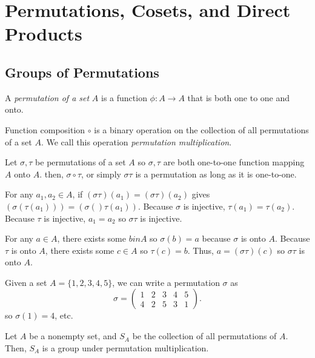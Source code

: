\chapter{Permutations, Cosets, and Direct Products}

\section{Groups of Permutations}

\begin{definition}
    A \emph{permutation of a set} $A$ is a function $\phi\colon A \to A$ that is both one to one and onto.
\end{definition}
\begin{remark}
    Function composition $\circ$ is a binary operation on the collection of all permutations of a set $A$. We call this operation \emph{permutation multiplication}.
\end{remark}
\begin{remark}
    Let $\sigma, \tau$ be permutations of a set $A$ so $\sigma, \tau$ are both one-to-one function mapping $A$ onto $A$. then, $\sigma\circ\tau$, or simply $\sigma\tau$ is a permutation as long as it is one-to-one.

    For any $a_1,a_2 \in A$, if $(\sigma\tau)(a_1)=(\sigma\tau)(a_2)$ gives $(\sigma(\tau(a_1)))=(\sigma()\tau(a_1))$. Because $\sigma$ is injective, $\tau(a_1)=\tau(a_2)$. Because $\tau$ is injective, $a_1=a_2$ so $\sigma\tau$ is injective.

    For any $a \in A$, there exists some $b in A$ so $\sigma(b) = a$ because $\sigma$ is onto $A$. Because $\tau$ is onto $A$, there exists some $c \in A$ so $\tau(c) = b$. Thus, $a = (\sigma\tau)(c)$ so $\sigma\tau$ is onto $A$.
\end{remark}
\begin{example}
    Given a set $A = \{1,2,3,4,5\}$, we can write a permutation $\sigma$ as 
    \[\sigma =
    \begin{pmatrix}
        1 & 2 & 3 & 4 & 5 \\
        4 & 2 & 5 & 3 & 1
    \end{pmatrix}.\] so $\sigma(1) = 4$, etc.
\end{example}
\begin{theorem}
    Let $A$ be a nonempty set, and $S_A$ be the collection of all permutations of $A$. Then, $S_A$ is a group under permutation multiplication.
\end{theorem}

